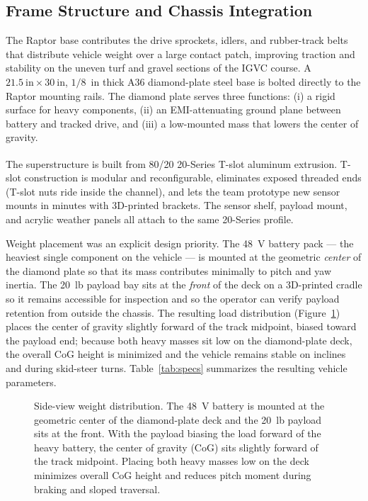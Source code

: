 \documentclass[11pt, letterpaper]{article}
\begin{document}
\subsection{Frame Structure and Chassis Integration}

The Raptor base contributes the drive sprockets, idlers, and rubber-track belts that
distribute vehicle weight over a large contact patch, improving traction and stability
on the uneven turf and gravel sections of the IGVC course. A $21.5~\text{in} \times 30~\text{in}$,
$1/8$~in thick A36 diamond-plate steel base is bolted directly to the Raptor mounting
rails. The diamond plate serves three functions: (i) a rigid surface for heavy
components, (ii) an EMI-attenuating ground plane between battery and tracked drive, and
(iii) a low-mounted mass that lowers the center of gravity.

The superstructure is built from 80/20\textsuperscript{\textregistered} 20-Series T-slot
aluminum extrusion. T-slot construction is modular and reconfigurable, eliminates exposed
threaded ends (T-slot nuts ride inside the channel), and lets the team prototype new
sensor mounts in minutes with 3D-printed brackets. The sensor shelf, payload mount, and
acrylic weather panels all attach to the same 20-Series profile.

Weight placement was an explicit design priority. The 48~V battery pack --- the heaviest
single component on the vehicle --- is mounted at the geometric \textit{center} of the
diamond plate so that its mass contributes minimally to pitch and yaw inertia. The 20~lb
payload bay sits at the \textit{front} of the deck on a 3D-printed cradle so it remains
accessible for inspection and so the operator can verify payload retention from outside
the chassis. The resulting load distribution (Figure~\ref{fig:weight_dist}) places the
center of gravity slightly forward of the track midpoint, biased toward the payload
end; because both heavy masses sit low on the diamond-plate deck, the overall CoG height
is minimized and the vehicle remains stable on inclines and during skid-steer turns.
Table~\ref{tab:specs} summarizes the resulting vehicle parameters.

\begin{figure}[H]
    \centering
    
    \caption{Side-view weight distribution. The 48~V battery is mounted at the geometric
    center of the diamond-plate deck and the 20~lb payload sits at the front. With the
    payload biasing the load forward of the heavy battery, the center of gravity (CoG)
    sits slightly forward of the track midpoint. Placing both heavy masses low on the
    deck minimizes overall CoG height and reduces pitch moment during braking and
    sloped traversal.}
    \label{fig:weight_dist}
\end{figure}
\end{document}
